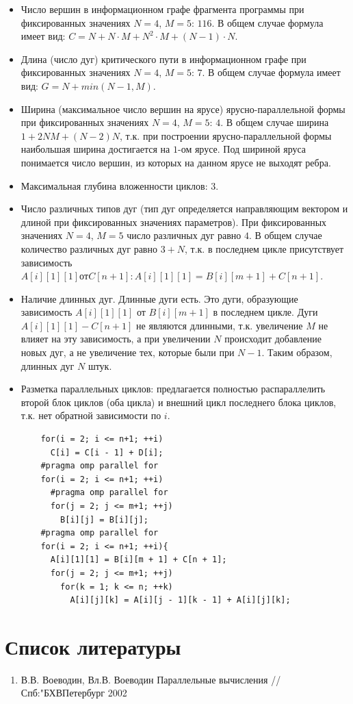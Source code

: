 \documentclass[a4paper, 12pt]{article}
\begin{document}
	\begin{itemize}
		\item Число вершин в информационном графе фрагмента программы при фиксированных значениях $N = 4$, $M = 5$: $116$. В общем случае формула имеет вид: $C = N + N \cdot M + N^2 \cdot M + (N - 1)\cdot N$.
		\item Длина (число дуг) критического пути в информационном графе при фиксированных значениях $N = 4$, $M = 5$: $7$. В общем случае формула имеет вид: $G = N + min\left(N - 1, M\right)$.
		\item Ширина (максимальное число вершин на ярусе) ярусно-параллельной формы при фиксированных значениях $N = 4$, $M = 5$: $4$. В общем случае ширина $1 + 2NM + (N -2)N$, т.к. при построении ярусно-параллельной формы наибольшая ширина достигается на $1$-ом ярусе. Под шириной яруса понимается число вершин, из которых на данном ярусе не выходят ребра.
		\item Максимальная глубина вложенности циклов: $3$.
		\item Число различных типов дуг (тип дуг определяется направляющим вектором и длиной при фиксированных значениях параметров). При фиксированных значениях $N = 4$, $M = 5$ число различных дуг равно $4$. В общем случае количество различных дуг равно $3 + N$, т.к. в последнем цикле присутствует зависимость $A[i][1][1] от C[n + 1]: A[i][1][1] = B[i][m + 1] + C[n + 1]$.
		\item Наличие длинных дуг. Длинные дуги есть. Это дуги, образующие зависимость $A[i][1][1]$ от $B[i][m + 1]$ в последнем цикле. Дуги $A[i][1][1] - C[n + 1]$ не являются длинными, т.к. увеличение $M$ не влияет на эту зависимость, а при увеличении $N$ происходит добавление новых дуг, а не увеличение тех, которые были при $N - 1$. Таким образом, длинных дуг $N$ штук.
		\item Разметка параллельных циклов: предлагается полностью распараллелить второй блок циклов (оба цикла) и внешний цикл последнего блока циклов, т.к. нет обратной зависимости по $i$.
		
			\lstset{language=C}
			\begin{lstlisting}
	for(i = 2; i <= n+1; ++i)
	  C[i] = C[i - 1] + D[i];
	#pragma omp parallel for
	for(i = 2; i <= n+1; ++i)
	  #pragma omp parallel for
	  for(j = 2; j <= m+1; ++j)
	    B[i][j] = B[i][j];
	#pragma omp parallel for
	for(i = 2; i <= n+1; ++i){
	  A[i][1][1] = B[i][m + 1] + C[n + 1];
	  for(j = 2; j <= m+1; ++j)
	    for(k = 1; k <= n; ++k)
	      A[i][j][k] = A[i][j - 1][k - 1] + A[i][j][k];
			\end{lstlisting}
	\end{itemize}

	\newpage
	
	\section*{Список литературы}
	
	\begin{enumerate}
		\item В.В. Воеводин, Вл.В. Воеводин Параллельные вычисления // Спб:"БХВПетербург 2002
	\end{enumerate}
\end{document}
